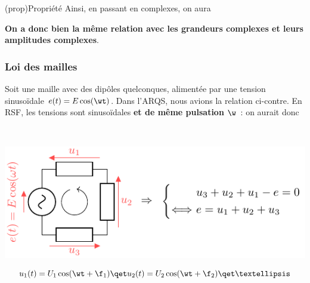 \documentclass[../../main/main.tex]{subfiles}
\begin{document}
\begin{tcb}(prop){Propriété}
	Ainsi, en passant en complexes, on aura
	\begin{center}
		\textbf{On a donc bien la même relation avec les grandeurs complexes et
			leurs amplitudes complexes}.
	\end{center}
\end{tcb}

\subsubsection{Loi des mailles}
\noindent
\begin{minipage}[t]{.48\linewidth}
	Soit une maille avec des dipôles quelconques, alimentée par une tension
	sinusoïdale $e(t) = E\cos(\wt)$. Dans l'ARQS, nous avions la relation ci-contre.
	En RSF, les tensions sont sinusoïdales \textbf{et de même pulsation} $\w$~: on
	aurait donc
\end{minipage}
\hfill
\begin{minipage}[t]{.48\linewidth}
	~
	\vspace{-40pt}
	\begin{center}
		\includegraphics[width=\linewidth]{ldm_rsf}
	\end{center}
\end{minipage}
\[
	u_1(t) = U_1\cos(\wt+\f_1)
	\qet
	u_2(t) = U_2\cos(\wt+\f_2)
	\qet
	…
\]
\end{document}
